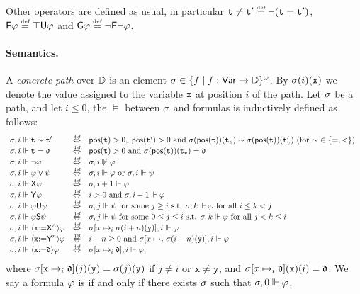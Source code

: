  Other operators are defined as usual, in particular $\aterm\neq \aterm'\egdef \neg(\aterm = \aterm')$, $\Eventually\aformula \egdef \top\Until\aformula$ and $\Always\aformula \egdef \neg\Eventually\neg\aformula$. 


\paragraph{Semantics.} A \emph{concrete path} over $\mathbb{D}$ is an element $\sigma\in\{f\mid f:{\rm \sf Var}\to\mathbb{D}\}^\omega$. By $\sigma(i)(\mathtt{x})$ we denote the value assigned to the variable $\mathtt{x}$ at position $i$ of the path.
Let $\sigma$ be a path, and let $i\leq 0$, the  $\models$ between $\sigma$ and formulas is inductively defined as follows:
\[
\begin{array}{lcl}
\apath,i \models \aterm \sim \aterm' & \iffdef & \pos(\aterm)>0, \ \pos(\aterm')> 0 \mbox{ and } \apath(\pos(\aterm))(\aterm_v) \sim \apath(\pos(\aterm))(\aterm'_v)  \mbox{ (for ${\sim}\in\{=,<\}$) } \\
\apath,i \models \aterm = \adatum & \iffdef & \pos(\aterm)>0 \mbox{ and } \apath(\pos(\aterm))(\aterm_v) = \adatum \\
\apath,i \models \neg\aformula & \iffdef & \apath,i \not\models\aformula \\
\apath,i \models \aformula\vee\aformulabis & \iffdef & \apath,i \models \aformula \mbox{ or } \apath,i \models \aformulabis \\
\apath,i \models \Next\aformula & \iffdef & \apath,i+1 \models \aformula \\ 
\apath,i \models \Prev\aformula & \iffdef & i>0 \mbox{ and } \apath,i-1 \models \aformula \\
\apath,i \models \aformula\Until\aformulabis & \iffdef & \apath,j \models \aformulabis \mbox{ for some } j\geq i \mbox{ s.t. } \apath,k \models \aformula \mbox{ for all } i\leq k < j \\
\apath,i \models \aformula\Since\aformulabis & \iffdef & \apath,j \models \aformulabis \mbox{ for some } 0\leq j \leq i \mbox{ s.t. } \apath,k \models \aformula \mbox{ for all } j< k \leq i \\
\apath,i \models \Assign{\avar}{\Nextn}\aformula & \iffdef & \apath[x\mapsto_i \apath(i+n)(\avarbis)],i \models \aformula \\ 
\apath,i \models \Assign{\avar}{\Prevn}\aformula & \iffdef & i-n\geq 0 \mbox{ and } \apath[x\mapsto_i \apath(i-n)(\avarbis)],i \models \aformula \\
\apath,i \models \Assign{\avar}{\adatum}\aformula & \iffdef & \apath[x\mapsto_i \adatum],i \models \aformula, \\ 
\end{array}
\]
where $\sigma[\mathtt{x}\mapsto_i \mathfrak{d}](j)(\mathtt{y})=\sigma(j)(\mathtt{y})$ if $j\neq i$  or $\mathtt{x}\neq\mathtt{y}$, and $\sigma[x\mapsto_i \mathfrak{d}](\mathtt{x})(i)  = \mathfrak{d}$. 
We say a formula $\varphi$ is  if and only if there exists $\sigma$ such that $\sigma,0\Vdash\varphi$.




